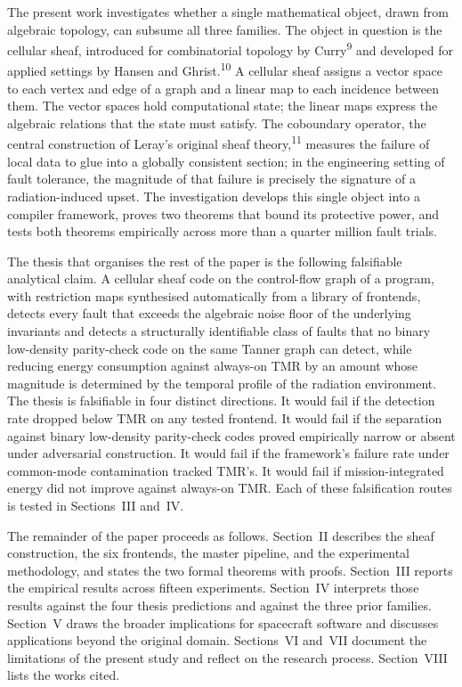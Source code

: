 \documentclass[12pt,a4paper]{article}
\theoremstyle{plain}
\theoremstyle{definition}
\begin{document}
The present work investigates whether a single mathematical object, drawn from algebraic topology, can subsume all three families. The object in question is the cellular sheaf, introduced for combinatorial topology by Curry\textsuperscript{9} and developed for applied settings by Hansen and Ghrist.\textsuperscript{10} A cellular sheaf assigns a vector space to each vertex and edge of a graph and a linear map to each incidence between them. The vector spaces hold computational state; the linear maps express the algebraic relations that the state must satisfy. The coboundary operator, the central construction of Leray's original sheaf theory,\textsuperscript{11} measures the failure of local data to glue into a globally consistent section; in the engineering setting of fault tolerance, the magnitude of that failure is precisely the signature of a radiation-induced upset. The investigation develops this single object into a compiler framework, proves two theorems that bound its protective power, and tests both theorems empirically across more than a quarter million fault trials.

The thesis that organises the rest of the paper is the following falsifiable analytical claim. A cellular sheaf code on the control-flow graph of a program, with restriction maps synthesised automatically from a library of frontends, detects every fault that exceeds the algebraic noise floor of the underlying invariants and detects a structurally identifiable class of faults that no binary low-density parity-check code on the same Tanner graph can detect, while reducing energy consumption against always-on TMR by an amount whose magnitude is determined by the temporal profile of the radiation environment. The thesis is falsifiable in four distinct directions. It would fail if the detection rate dropped below TMR on any tested frontend. It would fail if the separation against binary low-density parity-check codes proved empirically narrow or absent under adversarial construction. It would fail if the framework's failure rate under common-mode contamination tracked TMR's. It would fail if mission-integrated energy did not improve against always-on TMR. Each of these falsification routes is tested in Sections~III and~IV.

The remainder of the paper proceeds as follows. Section~II describes the sheaf construction, the six frontends, the master pipeline, and the experimental methodology, and states the two formal theorems with proofs. Section~III reports the empirical results across fifteen experiments. Section~IV interprets those results against the four thesis predictions and against the three prior families. Section~V draws the broader implications for spacecraft software and discusses applications beyond the original domain. Sections~VI and~VII document the limitations of the present study and reflect on the research process. Section~VIII lists the works cited.
\end{document}
